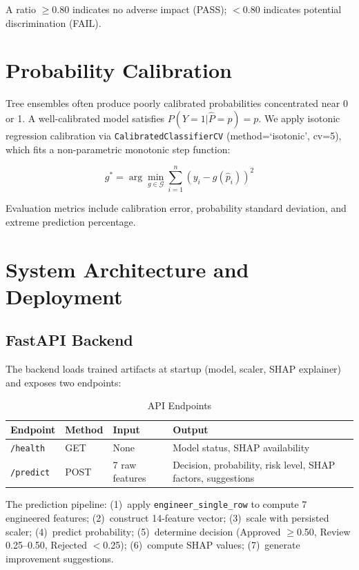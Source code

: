 \documentclass[12pt]{report}
\begin{document}
A ratio $\geq 0.80$ indicates no adverse impact (PASS); $< 0.80$ indicates potential discrimination (FAIL).


\section{Probability Calibration}

Tree ensembles often produce poorly calibrated probabilities concentrated near 0 or 1. A well-calibrated model satisfies $P(Y{=}1|\hat{P}{=}p) = p$. We apply isotonic regression calibration via \texttt{CalibratedClassifierCV} (method=`isotonic', cv=5), which fits a non-parametric monotonic step function:

\begin{equation}
g^* = \arg\min_{g \in \mathcal{G}} \sum_{i=1}^{n} (y_i - g(\hat{p}_i))^2
\end{equation}

Evaluation metrics include calibration error, probability standard deviation, and extreme prediction percentage.


\section{System Architecture and Deployment}

\subsection{FastAPI Backend}

The backend loads trained artifacts at startup (model, scaler, SHAP explainer) and exposes two endpoints:

\begin{table}[H]
\centering
\caption{API Endpoints}
\label{tab:api_endpoints}
\begin{tabular}{lllp{4.5cm}}
\toprule
\textbf{Endpoint} & \textbf{Method} & \textbf{Input} & \textbf{Output} \\
\midrule
\texttt{/health} & GET & None & Model status, SHAP availability \\
\texttt{/predict} & POST & 7 raw features & Decision, probability, risk level, SHAP factors, suggestions \\
\bottomrule
\end{tabular}
\end{table}

The prediction pipeline: (1)~apply \texttt{engineer\_single\_row} to compute 7 engineered features; (2)~construct 14-feature vector; (3)~scale with persisted scaler; (4)~predict probability; (5)~determine decision (Approved $\geq$0.50, Review 0.25--0.50, Rejected $<$0.25); (6)~compute SHAP values; (7)~generate improvement suggestions.
\end{document}
